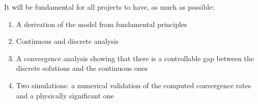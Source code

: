 \documentclass{article}
\begin{document}
It will be fundamental for all projects to have, as much as possible:
\begin{enumerate}
    \item A derivation of the model from fundamental principles
    \item Continuous and discrete analysis
    \item A convergence analysis showing that there is a controllable gap between the discrete solutions and the continuous ones
    \item Two simulations: a numerical validation of the computed convergence rates and a physically significant one
\end{enumerate}
\end{document}
